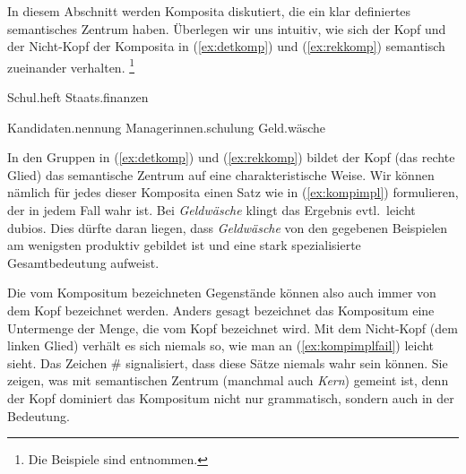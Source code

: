 \label{sec:detrekkomp}


In diesem Abschnitt werden Komposita diskutiert, die ein klar definiertes semantisches Zentrum haben.
Überlegen wir uns intuitiv, wie sich der Kopf und der Nicht-Kopf der Komposita in (\ref{ex:detkomp}) und (\ref{ex:rekkomp}) semantisch zueinander verhalten.%
\footnote{Die Beispiele sind \citealp[217ff.]{Eisenberg1} entnommen.}

\begin{exe}
  \ex\label{ex:detkomp}
  \begin{xlist}
  	\ex Schul.heft
  	\ex Staats.finanzen
  \end{xlist}
  \ex\label{ex:rekkomp}
  \begin{xlist}
    \ex Kandidaten.nennung
    \ex Managerinnen.schulung
    \ex Geld.wäsche
  \end{xlist}
\end{exe}

In den Gruppen in (\ref{ex:detkomp}) und (\ref{ex:rekkomp}) bildet der Kopf (das rechte Glied) das semantische Zentrum auf eine charakteristische Weise.
Wir können nämlich für jedes dieser Komposita einen Satz wie in (\ref{ex:kompimpl}) formulieren, der in jedem Fall wahr ist.
Bei \textit{Geldwäsche} klingt das Ergebnis evtl.\ leicht dubios.
Dies dürfte daran liegen, dass \textit{Geldwäsche} von den gegebenen Beispielen am wenigsten produktiv gebildet ist und eine stark spezialisierte Gesamtbedeutung aufweist.

\begin{exe}
  \ex\label{ex:kompimpl}
  \begin{xlist}
  \end{xlist}
\end{exe}

Die vom Kompositum bezeichneten Gegenstände können also auch immer von dem Kopf bezeichnet werden.
Anders gesagt bezeichnet das Kompositum eine Untermenge der Menge, die vom Kopf bezeichnet wird.
Mit dem Nicht-Kopf (dem linken Glied) verhält es sich niemals so, wie man an (\ref{ex:kompimplfail}) leicht sieht.
Das Zeichen \# signalisiert, dass diese Sätze niemals wahr sein können.
Sie zeigen, was mit semantischen Zentrum (manchmal auch \textit{Kern}) gemeint ist, denn der Kopf dominiert das Kompositum nicht nur grammatisch, sondern auch in der Bedeutung.

